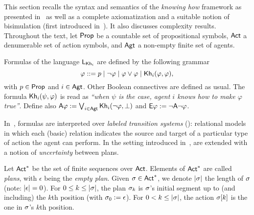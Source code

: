 This section recalls the syntax and semantics of the \emph{knowing how} framework as presented in~\cite{AFSVQ21} as well as a complete axiomatization and a suitable notion of bisimulation (first introduced in~\cite{AFSVQ23report}). It also discusses complexity results. Throughout the text, let ${\rm \sf Prop}$ be a countable set of propositional symbols, ${\rm \sf Act}$ a denumerable set of action symbols, and ${\rm \sf Agt}$ a non-empty finite set of agents.

\medskip

\begin{definition}\label{def:khsyntax}
Formulas of the language $\mathsf{L}_{{\sf Kh}_i}$ are defined by the following grammar
\[
    \varphi ::= p \mid \neg\varphi \mid \varphi\vee\varphi \mid
{\sf Kh}_i(\varphi,\varphi),
\]
with $p \in {\rm \sf Prop}$ and $i\in{\rm \sf Agt}$. Other Boolean connectives are defined as
usual. The formula ${\sf Kh}_i(\psi,\varphi)$ is read as
\emph{``when $\psi$ is the case, agent $i$ knows how to make
$\varphi$ true''}.
Define also ${\sf A}\varphi:=\bigvee_{i\in{\rm \sf Agt}} {\sf Kh}_i(\neg\varphi,\bot)$ and ${\sf E}\varphi:=\neg{\sf A}\neg\varphi$.
\end{definition}
\medskip

In~\cite{Wang15lori,Wang2016}, formulas are interpreted
over \emph{labeled transition systems} (\ltss): relational
models in which each (basic) relation indicates the source and target
of a particular type of action the agent can perform.
In the setting introduced in~\cite{AFSVQ21},  are extended with a notion of \emph{uncertainty} between plans.

\medskip

\begin{definition}
Let ${\rm \sf Act}^*$ be the set of finite sequences over ${\rm \sf Act}$. Elements of
${\rm \sf Act}^*$ are called \emph{plans}, with $\epsilon$ being the
\emph{empty plan}. %
Given $\sigma \in {\rm \sf Act}^*$, we denote $|{\sigma}|$ 
the length of $\sigma$ (note: $|{\epsilon}| = 0$). For
$0 \le k \le |{\sigma}|$, the plan $\sigma_k$ is $\sigma$'s initial
segment up to (and including) the $k$th position (with
$\sigma_0 := \epsilon$). For $0 < k \le |{\sigma}|$, the action
$\sigma[k]$ is the one in $\sigma$'s $k$th position.
\end{definition}

